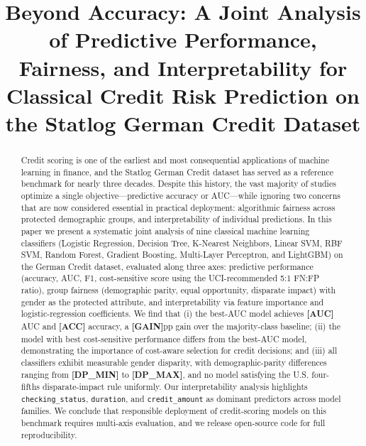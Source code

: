 \documentclass[conference]{IEEEtran}
\begin{document}
\title{Beyond Accuracy: A Joint Analysis of Predictive Performance, Fairness, and Interpretability for Classical Credit Risk Prediction on the Statlog German Credit Dataset}

\author{
}

\maketitle

\begin{abstract}
Credit scoring is one of the earliest and most consequential applications of machine learning in finance, and the Statlog German Credit dataset has served as a reference benchmark for nearly three decades. Despite this history, the vast majority of studies optimize a single objective---predictive accuracy or AUC---while ignoring two concerns that are now considered essential in practical deployment: algorithmic fairness across protected demographic groups, and interpretability of individual predictions. In this paper we present a systematic joint analysis of nine classical machine learning classifiers (Logistic Regression, Decision Tree, K-Nearest Neighbors, Linear SVM, RBF SVM, Random Forest, Gradient Boosting, Multi-Layer Perceptron, and LightGBM) on the German Credit dataset, evaluated along three axes: predictive performance (accuracy, AUC, F1, cost-sensitive score using the UCI-recommended 5:1 FN:FP ratio), group fairness (demographic parity, equal opportunity, disparate impact) with gender as the protected attribute, and interpretability via feature importance and logistic-regression coefficients. We find that (i) the best-AUC model achieves \textbf{[AUC]} AUC and \textbf{[ACC]} accuracy, a \textbf{[GAIN]}pp gain over the majority-class baseline; (ii) the model with best cost-sensitive performance differs from the best-AUC model, demonstrating the importance of cost-aware selection for credit decisions; and (iii) all classifiers exhibit measurable gender disparity, with demographic-parity differences ranging from \textbf{[DP_MIN]} to \textbf{[DP_MAX]}, and no model satisfying the U.S. four-fifths disparate-impact rule uniformly. Our interpretability analysis highlights \texttt{checking\_status}, \texttt{duration}, and \texttt{credit\_amount} as dominant predictors across model families. We conclude that responsible deployment of credit-scoring models on this benchmark requires multi-axis evaluation, and we release open-source code for full reproducibility.
\end{abstract}
\end{document}

